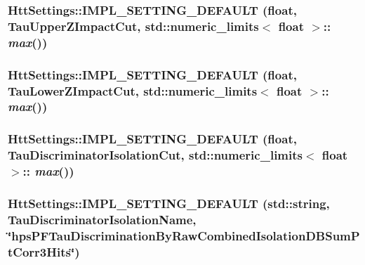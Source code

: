\hypertarget{classHttSettings_a6a8a32ca297a735b05c67ef579ef594a}{
\subsubsection[{IMPL\_\-SETTING\_\-DEFAULT}]{\setlength{\rightskip}{0pt plus 5cm}HttSettings::IMPL\_\-SETTING\_\-DEFAULT (float, \/  TauUpperZImpactCut, \/  std::numeric\_\-limits$<$ float $>$:: {\em max}())}}
\label{classHttSettings_a6a8a32ca297a735b05c67ef579ef594a}
\hypertarget{classHttSettings_a52928e3bba3d62d14e8138e2cab0f63e}{
\subsubsection[{IMPL\_\-SETTING\_\-DEFAULT}]{\setlength{\rightskip}{0pt plus 5cm}HttSettings::IMPL\_\-SETTING\_\-DEFAULT (float, \/  TauLowerZImpactCut, \/  std::numeric\_\-limits$<$ float $>$:: {\em max}())}}
\label{classHttSettings_a52928e3bba3d62d14e8138e2cab0f63e}
\hypertarget{classHttSettings_a1578ae26bbc066aa5706fbbd1d8a495c}{
\subsubsection[{IMPL\_\-SETTING\_\-DEFAULT}]{\setlength{\rightskip}{0pt plus 5cm}HttSettings::IMPL\_\-SETTING\_\-DEFAULT (float, \/  TauDiscriminatorIsolationCut, \/  std::numeric\_\-limits$<$ float $>$:: {\em max}())}}
\label{classHttSettings_a1578ae26bbc066aa5706fbbd1d8a495c}
\hypertarget{classHttSettings_a2b5e602f6e39dc6a1f02edc944fd5419}{
\subsubsection[{IMPL\_\-SETTING\_\-DEFAULT}]{\setlength{\rightskip}{0pt plus 5cm}HttSettings::IMPL\_\-SETTING\_\-DEFAULT (std::string, \/  TauDiscriminatorIsolationName, \/  \char`\"{}hpsPFTauDiscriminationByRawCombinedIsolationDBSumPtCorr3Hits\char`\"{})}}
